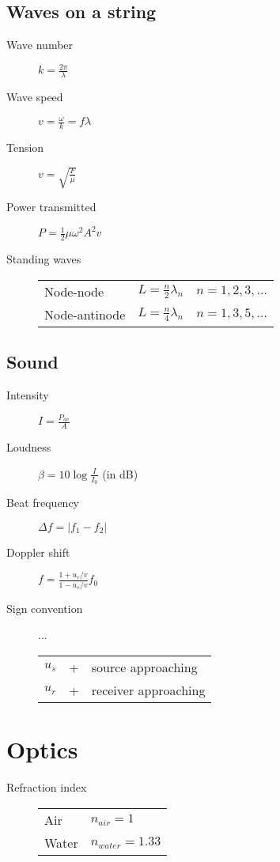 \documentclass{article}
\newcommand{\bd}{\begin{description}}
\newcommand{\ed}{\end{description}}
\newcommand{\half}{\frac{1}{2}}
\begin{document}
\subsection{Waves on a string}
\bd
	\item[Wave number] $ k = \frac{2\pi}{\lambda} $
	\item[Wave speed] $ v = \frac{\omega}{k} = f \lambda $
	\item[Tension] $ v = \sqrt{\frac{F}{\mu}} $
	\item[Power transmitted] $ P = \half \mu \omega^2 A^2 v $
	\item[Standing waves]
		\begin{tabular}{lll}
			Node-node & $ L = \frac{n}{2} \lambda_n $ & $ n=1,2,3,\ldots $ \\
			Node-antinode & $ L = \frac{n}{4} \lambda_n $ & $ n=1,3,5,\ldots $
		\end{tabular}
\ed

\subsection{Sound}
\bd
	\item[Intensity] $ I = \frac{P_{av}}{A} $
	\item[Loudness] $ \beta = 10 \log\frac{I}{I_0} $ (in dB)
	\item[Beat frequency] $\Delta f = |f_1 - f_2| $
	\item[Doppler shift] $ f = \frac{1+u_r/v}{1-u_s/v} f_0 $
	\item[Sign convention] ...\newline
		\begin{tabular}{lll}
			$u_s$ & + & source approaching \\
			$u_r$ & + & receiver approaching
		\end{tabular}
\ed
\clearpage

\section{Optics}
\bd
 \item[Refraction index]
  \begin{tabular}{ll}
   Air & $ n_{air} = 1 $ \\
   Water & $ n_{water} = 1.33 $
  \end{tabular}
\ed
\end{document}
